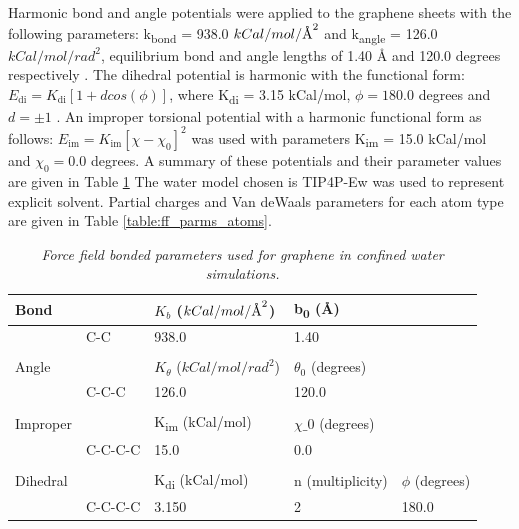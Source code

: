 \documentclass[12pt]{article}
\newcommand{\angstrom}{\textup{\AA}}
\begin{document}
Harmonic bond and angle potentials were applied to the graphene sheets with 
the following parameters: k\textsubscript{bond} = 938.0 \(kCal/mol/\angstrom^2\)
and k\textsubscript{angle} = 126.0 \(kCal/mol/rad^2\), equilibrium bond and 
angle lengths of 1.40 \r A and 120.0 degrees respectively \cite{Hummer2001}. The
dihedral potential is harmonic with the functional form: \(E_{\text{di}} = K_{\text{di}} [ 1 + d cos(\phi)]\),
where K\textsubscript{di} = 3.15 kCal/mol, \(\phi = 180.0\) degrees and \(d = \pm 1\) \cite{Patra2009}. An improper torsional 
potential with a harmonic functional form as follows: \( E_{\text{im}} = K_{\text{im}} [ \chi - \chi_0 ]^2\) was
used with parameters K\textsubscript{im} =  15.0 kCal/mol and \(\chi_0 = 0.0\) degrees. A summary
of these potentials and their parameter values are given in Table \ref{table:ff_parms}
The water model chosen is TIP4P-Ew \cite{Horn2004} was used 
to represent explicit solvent. Partial charges and Van deWaals parameters for each atom type 
are given in Table \ref{table:ff_parms_atoms}.

\begin{table}[ht!]
\centering
\begin{tabular}{ lllll } \hline
Bond     &         & \(K_b\)  (\(kCal/mol/\angstrom^2\))      & b\textsubscript{0}  (\r A)            &          \\ \hline
         & C-C     & 938.0         & 1.40            &          \\
         &         &               &                 &          \\ \hline
Angle    &         & \(K_{\theta}\)  (\(kCal/mol/rad^2\)) & \(\theta_0\) (degrees)   &          \\ \hline
         & C-C-C   & 126.0         & 120.0           &          \\
                           &         &               &                 &          \\ \hline
Improper &         & K\textsubscript{im} (kCal/mol)       & \(\chi\_0\) (degrees)     &          \\ \hline
         & C-C-C-C & 15.0          & 0.0             &          \\
                           &         &               &                 &          \\ \hline
Dihedral &         & K\textsubscript{di} (kCal/mol)       & n (multiplicity) & \(\phi\) (degrees)\\ \hline
         & C-C-C-C & 3.150         & 2               & 180.0  \\ 
\end{tabular}
\caption{\textit{Force field bonded parameters used for graphene in confined water simulations.}}
\label{table:ff_parms}
\end{table}
\end{document}
